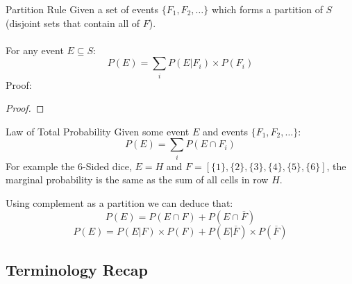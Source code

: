 \begin{definitionbox}{Partition Rule}
	Given a set of events $\{F_1, F_2, \dots\}$ which forms a partition of $S$ (disjoint sets that contain all of $F$).
	\\
	\\ For any event $E \subseteq S$:
	\[P(E) = \sum_iP(E|F_i) \times P(F_i)\]
	Proof:
	\begin{proof}
	\end{proof}
\end{definitionbox}

\begin{definitionbox}{Law of Total Probability}
    Given some event $E$ and events $\{F_1, F_2, \dots\}$:
    \[P(E) = \sum_i{P(E \cap F_i)}\]
    For example the 6-Sided dice, $E = {H}$ and $F = [\{1\},\{2\},\{3\},\{4\},\{5\},\{6\}]$, the marginal probability is the same as the sum of all cells in row $H$.
\end{definitionbox}

Using complement as a partition we can deduce that:
\[P(E) = P(E \cap F) + P(E \cap \overline{F})\]
\[P(E) = P(E|F) \times P(F) + P(E|\overline{F}) \times P(\overline{F})\]

\subsection{Terminology Recap}
\begin{itemize}
\end{itemize}
